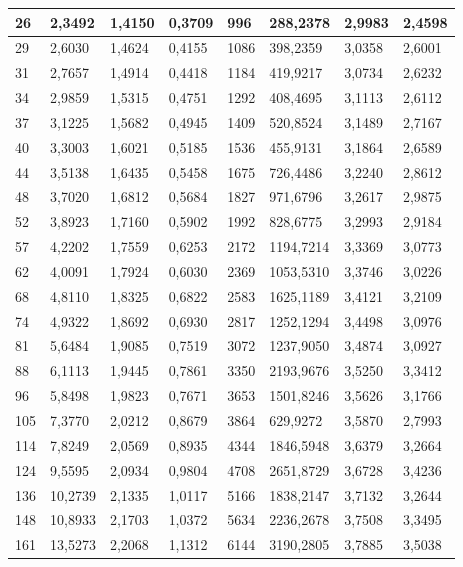\documentclass[letterpaper,titlepage,12pt,draft]{report}
\begin{document}
\begin{table}[H]
\begin{tiny}
{\begin{tabular}{|
>{\columncolor[HTML]{FFFFC7}}l |l|l|l|
>{\columncolor[HTML]{FFFFC7}}l |l|l|l|}
26 & 2,3492 & 1,4150 & 0,3709 & 996 & 288,2378 & 2,9983 & 2,4598 \\ \hline
29 & 2,6030 & 1,4624 & 0,4155 & 1086 & 398,2359 & 3,0358 & 2,6001 \\ \hline
31 & 2,7657 & 1,4914 & 0,4418 & 1184 & 419,9217 & 3,0734 & 2,6232 \\ \hline
34 & 2,9859 & 1,5315 & 0,4751 & 1292 & 408,4695 & 3,1113 & 2,6112 \\ \hline
37 & 3,1225 & 1,5682 & 0,4945 & 1409 & 520,8524 & 3,1489 & 2,7167 \\ \hline
40 & 3,3003 & 1,6021 & 0,5185 & 1536 & 455,9131 & 3,1864 & 2,6589 \\ \hline
44 & 3,5138 & 1,6435 & 0,5458 & 1675 & 726,4486 & 3,2240 & 2,8612 \\ \hline
48 & 3,7020 & 1,6812 & 0,5684 & 1827 & 971,6796 & 3,2617 & 2,9875 \\ \hline
52 & 3,8923 & 1,7160 & 0,5902 & 1992 & 828,6775 & 3,2993 & 2,9184 \\ \hline
57 & 4,2202 & 1,7559 & 0,6253 & 2172 & 1194,7214 & 3,3369 & 3,0773 \\ \hline
62 & 4,0091 & 1,7924 & 0,6030 & 2369 & 1053,5310 & 3,3746 & 3,0226 \\ \hline
68 & 4,8110 & 1,8325 & 0,6822 & 2583 & 1625,1189 & 3,4121 & 3,2109 \\ \hline
74 & 4,9322 & 1,8692 & 0,6930 & 2817 & 1252,1294 & 3,4498 & 3,0976 \\ \hline
81 & 5,6484 & 1,9085 & 0,7519 & 3072 & 1237,9050 & 3,4874 & 3,0927 \\ \hline
88 & 6,1113 & 1,9445 & 0,7861 & {\color[HTML]{FE0000} 3350} & {\color[HTML]{FE0000} 2193,9676} & {\color[HTML]{FE0000} 3,5250} & {\color[HTML]{FE0000} 3,3412} \\ \hline
96 & 5,8498 & 1,9823 & 0,7671 & 3653 & 1501,8246 & 3,5626 & 3,1766 \\ \hline
105 & 7,3770 & 2,0212 & 0,8679 & 3864 & 629,9272 & 3,5870 & 2,7993 \\ \hline
114 & 7,8249 & 2,0569 & 0,8935 & 4344 & 1846,5948 & 3,6379 & 3,2664 \\ \hline
124 & 9,5595 & 2,0934 & 0,9804 & 4708 & 2651,8729 & 3,6728 & 3,4236 \\ \hline
136 & 10,2739 & 2,1335 & 1,0117 & 5166 & 1838,2147 & 3,7132 & 3,2644 \\ \hline
148 & 10,8933 & 2,1703 & 1,0372 & 5634 & 2236,2678 & 3,7508 & 3,3495 \\ \hline
161 & 13,5273 & 2,2068 & 1,1312 & 6144 & 3190,2805 & 3,7885 & 3,5038 \\ \hline

\end{tabular}}
\end{tiny}
\end{table}
\end{document}
